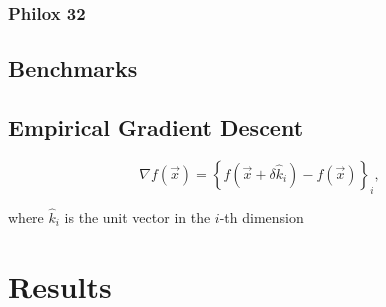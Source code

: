 \documentclass{article}
\begin{document}
            \subsubsection{Philox 32}

        \subsection{Benchmarks}

        \subsection{Empirical Gradient Descent}

            \begin{equation}
                \nabla f(\vec{x}) = \left\{f\left(\vec{x} + \delta \hat{k}_i\right) - f\left(\vec{x}\right)\right\}_i,
            \end{equation}

            where $\hat{k}_i$ is the unit vector in the $i$-th dimension

    \section{Results}
\end{document}
